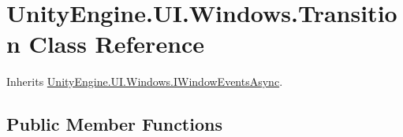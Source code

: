 \hypertarget{class_unity_engine_1_1_u_i_1_1_windows_1_1_transition}{}\section{Unity\+Engine.\+U\+I.\+Windows.\+Transition Class Reference}
\label{class_unity_engine_1_1_u_i_1_1_windows_1_1_transition}


Inherits \hyperlink{interface_unity_engine_1_1_u_i_1_1_windows_1_1_i_window_events_async}{Unity\+Engine.\+U\+I.\+Windows.\+I\+Window\+Events\+Async}.

\subsection*{Public Member Functions}
